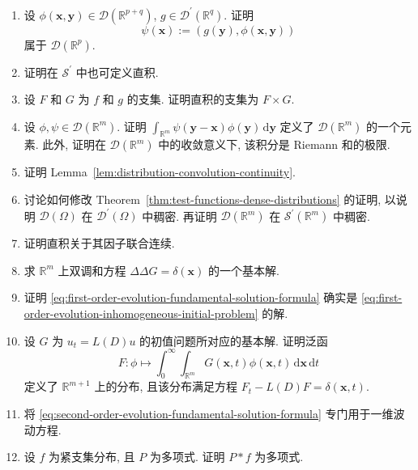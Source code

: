 \begin{enumerate}[label=\thesection.\arabic*.,ref=\thesection.\arabic*,start=33,series=book-problems]

\item\label{ex:distribution-smooth-test-parameter-map} 设 $\phi(\bm{x},\bm{y})\in\mathcal{D}(\mathbb{R}^{p+q})$, $g\in\mathcal{D}^{\prime}(\mathbb{R}^q)$. 证明 \[\psi(\bm{x}):=(g(\bm{y}),\phi(\bm{x},\bm{y}))\] 属于 $\mathcal{D}(\mathbb{R}^p)$.

\item\label{ex:tempered-direct-product} 证明在 $\mathcal{S}^{\prime}$ 中也可定义直积.

\item\label{ex:direct-product-support} 设 $F$ 和 $G$ 为 $f$ 和 $g$ 的支集. 证明直积的支集为 $F\times G$.

\item\label{ex:test-function-integral-riemann-sums} 设 $\phi,\psi\in\mathcal{D}(\mathbb{R}^m)$. 证明 $\int_{\mathbb{R}^m}\psi(\bm{y}-\bm{x})\phi(\bm{y})\,\mathrm{d}\bm{y}$ 定义了 $\mathcal{D}(\mathbb{R}^m)$ 的一个元素. 此外, 证明在 $\mathcal{D}(\mathbb{R}^m)$ 中的收敛意义下, 该积分是 Riemann 和的极限.

\item\label{ex:distribution-convolution-continuity} 证明 Lemma~\ref{lem:distribution-convolution-continuity}.

\item\label{ex:test-functions-dense-tempered-distributions} 讨论如何修改 Theorem~\ref{thm:test-functions-dense-distributions} 的证明, 以说明 $\mathcal{D}(\Omega)$ 在 $\mathcal{D}^{\prime}(\Omega)$ 中稠密. 再证明 $\mathcal{D}(\mathbb{R}^m)$ 在 $\mathcal{S}^{\prime}(\mathbb{R}^m)$ 中稠密.

\item\label{ex:direct-product-joint-continuity} 证明直积关于其因子联合连续.

\item\label{ex:biharmonic-fundamental-solution} 求 $\mathbb{R}^m$ 上双调和方程 $\Delta\Delta G=\delta(\bm{x})$ 的一个基本解.

\item\label{ex:inhomogeneous-fundamental-solution-formula} 证明 \eqref{eq:first-order-evolution-fundamental-solution-formula} 确实是 \eqref{eq:first-order-evolution-inhomogeneous-initial-problem} 的解.

\item\label{ex:evolution-fundamental-spacetime-delta} 设 $G$ 为 $u_t=L(D)u$ 的初值问题所对应的基本解. 证明泛函
\begin{equation}\label{eq:evolution-fundamental-solution-spacetime-functional}
F:\phi\mapsto\int_0^\infty\int_{\mathbb{R}^m}G(\bm{x},t)\phi(\bm{x},t)\,\mathrm{d}\bm{x}\,\mathrm{d}t
\end{equation}
定义了 $\mathbb{R}^{m+1}$ 上的分布, 且该分布满足方程 $F_t-L(D)F=\delta(\bm{x},t)$.

\item\label{ex:wave-one-dimensional-duhamel-formula} 将 \eqref{eq:second-order-evolution-fundamental-solution-formula} 专门用于一维波动方程.

\item\label{ex:polynomial-compact-distribution-convolution} 设 $f$ 为紧支集分布, 且 $P$ 为多项式. 证明 $P*f$ 为多项式.

\end{enumerate}
